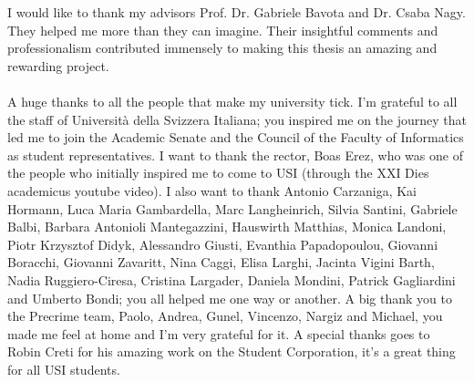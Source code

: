 \documentclass[11pt, mscthesis]{usiinfthesis}
\begin{document}
\begin{abstract}


\end{abstract}


\begin{acknowledgements}
I would like to thank my advisors Prof. Dr. Gabriele Bavota and Dr. Csaba Nagy. They helped me more than they can imagine. Their insightful comments and professionalism contributed immensely to making this thesis an amazing and rewarding project.
\\
\\
A huge thanks to all the people that make my university tick. I'm grateful to all the staff of Universit\`a della Svizzera Italiana; you inspired me on the journey that led me to join the Academic Senate and the Council of the Faculty of Informatics as student representatives. I want to thank the rector, Boas Erez, who was one of the people who initially inspired me to come to USI (through the XXI Dies academicus youtube video). I also want to thank Antonio Carzaniga, Kai Hormann, Luca Maria Gambardella, Marc Langheinrich, Silvia Santini, Gabriele Balbi, Barbara Antonioli Mantegazzini, Hauswirth Matthias, Monica Landoni, Piotr Krzysztof Didyk, Alessandro Giusti, Evanthia Papadopoulou, Giovanni Boracchi, Giovanni Zavaritt, Nina Caggi, Elisa Larghi, Jacinta Vigini Barth, Nadia Ruggiero-Ciresa, Cristina Largader, Daniela Mondini, Patrick Gagliardini and Umberto Bondi; you all helped me one way or another. A big thank you to the Precrime team, Paolo, Andrea, Gunel, Vincenzo, Nargiz and Michael, you made me feel at home and I’m very grateful for it. A special thanks goes to Robin Creti for his amazing work on the Student Corporation, it’s a great thing for all USI students.


\end{acknowledgements}
\end{document}
